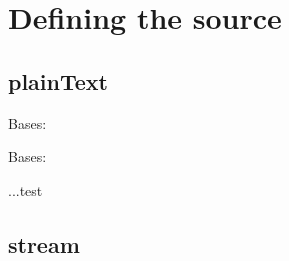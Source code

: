\documentclass[letterpaper,10pt,english]{sphinxmanual}
\begin{document}
\chapter{Defining the source}
\label{source::doc}\label{source:defining-the-source}

\section{plainText}
\label{source:plaintext}\label{source:module-diaGrabber.source.plainText}

\begin{fulllineitems}
\label{source:diaGrabber.source.plainText.plainText}
Bases: 

\begin{fulllineitems}
\label{source:diaGrabber.source.plainText.plainText.dimension}
Bases: {\hyperref[dimensions:diaGrabber.source._dimension._dimension]{}}

...test

\end{fulllineitems}


\end{fulllineitems}



\section{stream}
\label{source:module-diaGrabber.source.stream}\label{source:stream}
\end{document}
